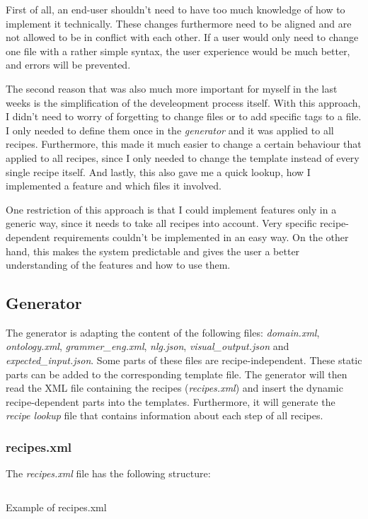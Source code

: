 \documentclass[
	11pt, %
]{fphw}
\newenvironment{code}
    {\captionsetup{
        type=listing,
        skip=2pt,
        belowskip=15pt
        }}
    {}
\begin{document}
First of all, an end-user shouldn't need to have too much knowledge of how to implement it technically. These changes furthermore need to be aligned and are not allowed to be in conflict with each other. If a user would only need to change one file with a rather simple syntax, the user experience would be much better, and errors will be prevented.

The second reason that was also much more important for myself in the last weeks is the simplification of the develeopment process itself. With this approach, I didn't need to worry of forgetting to change files or to add specific tags to a file. I only needed to define them once in the \emph{generator} and it was applied to all recipes. Furthermore, this made it much easier to change a certain behaviour that applied to all recipes, since I only needed to change the template instead of every single recipe itself. And lastly, this also gave me a quick lookup, how I implemented a feature and which files it involved.

One restriction of this approach is that I could implement features only in a generic way, since it needs to take all recipes into account. Very specific recipe-dependent requirements couldn't be implemented in an easy way. On the other hand, this makes the system predictable and gives the user a better understanding of the features and how to use them.

\subsection*{Generator}
The generator is adapting the content of the following files: \emph{domain.xml}, \emph{ontology.xml}, \emph{grammer\_eng.xml}, \emph{nlg.json}, \emph{visual\_output.json} and \emph{expected\_input.json}. Some parts of these files are recipe-independent. These static parts can be added to the corresponding template file. The generator will then read the XML file containing the recipes (\emph{recipes.xml}) and insert the dynamic recipe-dependent parts into the templates. Furthermore, it will generate the \emph{recipe lookup} file that contains information about each step of all recipes.

\subsubsection*{recipes.xml}
The \emph{recipes.xml} file has the following structure:

\begin{code}
    \inputminted{xml}{includes/recipes.xml}
    \caption{Example of recipes.xml}
\end{code}
\end{document}
